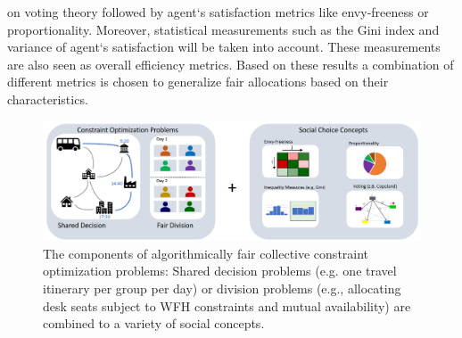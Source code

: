 \documentclass[german, a4paper, 11pt, oneside]{scrbook}
\begin{document}
on voting theory followed by agent`s satisfaction metrics like envy-freeness or proportionality. Moreover, statistical measurements such as the Gini index and variance of agent`s satisfaction will be taken into account. These measurements are also seen as overall efficiency metrics. Based on these results a combination of different metrics is chosen to generalize fair allocations based on their characteristics.
\begin{figure}[h]
    \centering
    \includegraphics[width=\textwidth]{concepts}
    \caption{The components of algorithmically fair collective constraint optimization problems: Shared decision problems (e.g. one travel itinerary per group per day) or division problems (e.g., allocating desk seats subject to WFH constraints and mutual availability) are combined to a variety of social concepts.}
    \label{fig:overview}
\end{figure}
\end{document}
